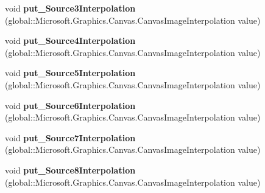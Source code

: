 \begin{DoxyCompactItemize}
\item 
\mbox{\label{interface_microsoft_1_1_graphics_1_1_canvas_1_1_effects_1_1_i_pixel_shader_effect_a680f1e84ebf42e030e0f1a5a5842944d}} 
void {\bfseries put\+\_\+\+Source3\+Interpolation} (global\+::\+Microsoft.\+Graphics.\+Canvas.\+Canvas\+Image\+Interpolation value)
\item 
\mbox{\label{interface_microsoft_1_1_graphics_1_1_canvas_1_1_effects_1_1_i_pixel_shader_effect_ad63dd0ae5f2600be010a92793511143d}} 
void {\bfseries put\+\_\+\+Source4\+Interpolation} (global\+::\+Microsoft.\+Graphics.\+Canvas.\+Canvas\+Image\+Interpolation value)
\item 
\mbox{\label{interface_microsoft_1_1_graphics_1_1_canvas_1_1_effects_1_1_i_pixel_shader_effect_aaf75f383e15e91bc0563349e2d4bde82}} 
void {\bfseries put\+\_\+\+Source5\+Interpolation} (global\+::\+Microsoft.\+Graphics.\+Canvas.\+Canvas\+Image\+Interpolation value)
\item 
\mbox{\label{interface_microsoft_1_1_graphics_1_1_canvas_1_1_effects_1_1_i_pixel_shader_effect_ad9f66401b19f61ce51eaf5f43fdae18e}} 
void {\bfseries put\+\_\+\+Source6\+Interpolation} (global\+::\+Microsoft.\+Graphics.\+Canvas.\+Canvas\+Image\+Interpolation value)
\item 
\mbox{\label{interface_microsoft_1_1_graphics_1_1_canvas_1_1_effects_1_1_i_pixel_shader_effect_a3141b1fa6f7290cd884ff32be5b22264}} 
void {\bfseries put\+\_\+\+Source7\+Interpolation} (global\+::\+Microsoft.\+Graphics.\+Canvas.\+Canvas\+Image\+Interpolation value)
\item 
\mbox{\label{interface_microsoft_1_1_graphics_1_1_canvas_1_1_effects_1_1_i_pixel_shader_effect_af68ecdcfaddf02fc7641f0ccfbf88dca}} 
void {\bfseries put\+\_\+\+Source8\+Interpolation} (global\+::\+Microsoft.\+Graphics.\+Canvas.\+Canvas\+Image\+Interpolation value)

\end{DoxyCompactItemize}
